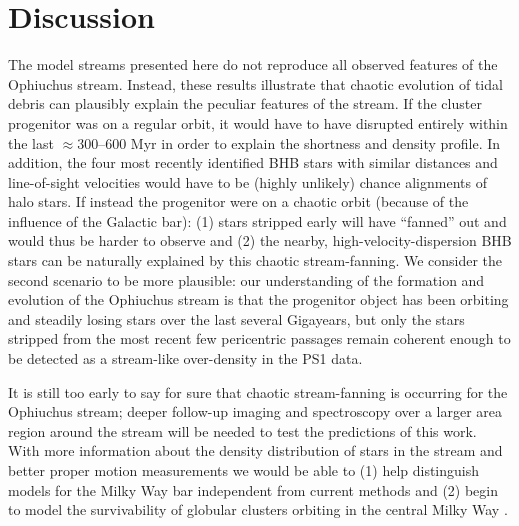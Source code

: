 \documentclass[letterpaper,12pt,preprint]{aastex}
\begin{document}
\section{Discussion}\label{sec:discussion}

The model streams presented here do not reproduce all observed features of the Ophiuchus stream. Instead, these results illustrate that chaotic evolution of tidal debris can plausibly explain the peculiar features of the stream. If the cluster progenitor was on a regular orbit, it would have to have disrupted entirely within the last $\approx$300--600 Myr in order to explain the shortness and density profile. In addition, the four most recently identified BHB stars with similar distances and line-of-sight velocities would have to be (highly unlikely) chance alignments of halo stars. If instead the progenitor were on a chaotic orbit (because of the influence of the Galactic bar): (1) stars stripped early will have ``fanned'' out and would thus be harder to observe and (2) the nearby, high-velocity-dispersion BHB stars can be naturally explained by this chaotic stream-fanning. We consider the second scenario to be more plausible: our understanding of the formation and evolution of the Ophiuchus stream is that the progenitor object has been orbiting and steadily losing stars over the last several Gigayears, but only the stars stripped from the most recent few pericentric passages remain coherent enough to be detected as a stream-like over-density in the PS1 data.

It is still too early to say for sure that chaotic stream-fanning is occurring for the Ophiuchus stream; deeper follow-up imaging and spectroscopy over a larger area region around the stream will be needed to test the predictions of this work. With more information about the density distribution of stars in the stream and better proper motion measurements we would be able to (1) help distinguish models for the Milky Way bar independent from current methods and (2) begin to model the survivability of globular clusters orbiting in the central Milky Way \citep[e.g.,][]{gnedin97}. 
\end{document}
